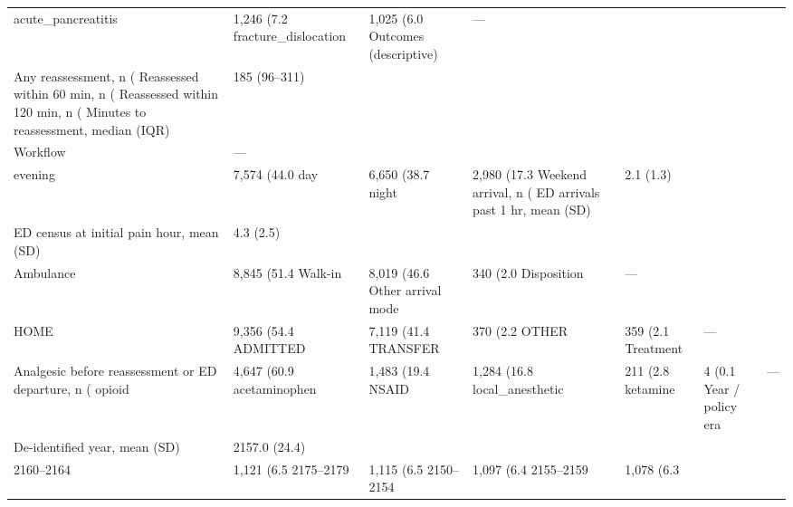 \begin{table}[ht]
\begin{tabular}{ll}
  acute_pancreatitis & 1,246 (7.2%
  fracture_dislocation & 1,025 (6.0%
Outcomes (descriptive) & — \\
Any reassessment, n (%
Reassessed within 60 min, n (%
Reassessed within 120 min, n (%
Minutes to reassessment, median (IQR) & 185 (96–311) \\
Workflow & — \\
  evening & 7,574 (44.0%
  day & 6,650 (38.7%
  night & 2,980 (17.3%
Weekend arrival, n (%
ED arrivals past 1 hr, mean (SD) & 2.1 (1.3) \\
ED census at initial pain hour, mean (SD) & 4.3 (2.5) \\
  Ambulance & 8,845 (51.4%
  Walk-in & 8,019 (46.6%
  Other arrival mode & 340 (2.0%
Disposition & — \\
  HOME & 9,356 (54.4%
  ADMITTED & 7,119 (41.4%
  TRANSFER & 370 (2.2%
  OTHER & 359 (2.1%
Treatment & — \\
Analgesic before reassessment or ED departure, n (%
  opioid & 4,647 (60.9%
  acetaminophen & 1,483 (19.4%
  NSAID & 1,284 (16.8%
  local_anesthetic & 211 (2.8%
  ketamine & 4 (0.1%
Year / policy era & — \\
De-identified year, mean (SD) & 2157.0 (24.4) \\
  2160–2164 & 1,121 (6.5%
  2175–2179 & 1,115 (6.5%
  2150–2154 & 1,097 (6.4%
  2155–2159 & 1,078 (6.3%

\end{tabular}
\end{table}
